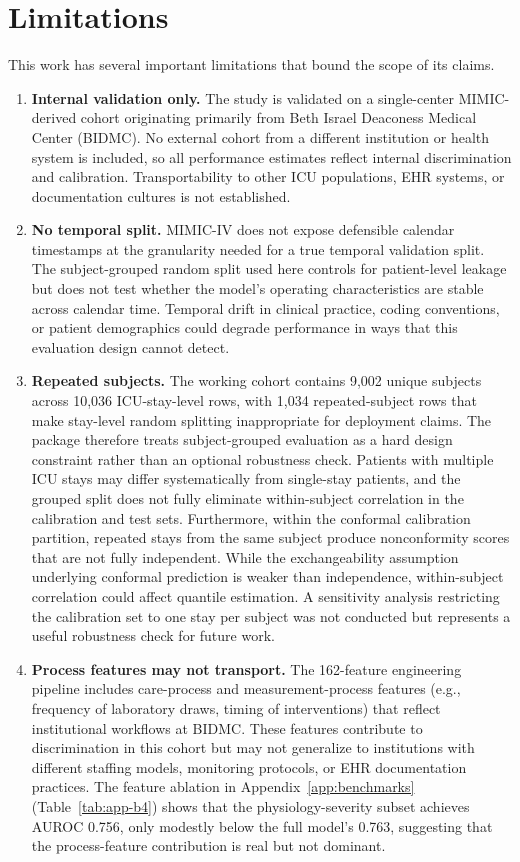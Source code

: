 \section{Limitations}
This work has several important limitations that bound the scope of its claims.
\begin{enumerate}
\item \textbf{Internal validation only.} The study is validated on a single-center MIMIC-derived cohort originating primarily from Beth Israel Deaconess Medical Center (BIDMC). No external cohort from a different institution or health system is included, so all performance estimates reflect internal discrimination and calibration. Transportability to other ICU populations, EHR systems, or documentation cultures is not established.

\item \textbf{No temporal split.} MIMIC-IV does not expose defensible calendar timestamps at the granularity needed for a true temporal validation split. The subject-grouped random split used here controls for patient-level leakage but does not test whether the model's operating characteristics are stable across calendar time. Temporal drift in clinical practice, coding conventions, or patient demographics could degrade performance in ways that this evaluation design cannot detect.

\item \textbf{Repeated subjects.} The working cohort contains 9{,}002 unique subjects across 10{,}036 ICU-stay-level rows, with 1{,}034 repeated-subject rows that make stay-level random splitting inappropriate for deployment claims. The package therefore treats subject-grouped evaluation as a hard design constraint rather than an optional robustness check. Patients with multiple ICU stays may differ systematically from single-stay patients, and the grouped split does not fully eliminate within-subject correlation in the calibration and test sets. Furthermore, within the conformal calibration partition, repeated stays from the same subject produce nonconformity scores that are not fully independent. While the exchangeability assumption underlying conformal prediction is weaker than independence, within-subject correlation could affect quantile estimation. A sensitivity analysis restricting the calibration set to one stay per subject was not conducted but represents a useful robustness check for future work.

\item \textbf{Process features may not transport.} The 162-feature engineering pipeline includes care-process and measurement-process features (e.g., frequency of laboratory draws, timing of interventions) that reflect institutional workflows at BIDMC. These features contribute to discrimination in this cohort but may not generalize to institutions with different staffing models, monitoring protocols, or EHR documentation practices. The feature ablation in Appendix~\ref{app:benchmarks} (Table~\ref{tab:app-b4}) shows that the physiology-severity subset achieves AUROC 0.756, only modestly below the full model's 0.763, suggesting that the process-feature contribution is real but not dominant.


\end{enumerate}
